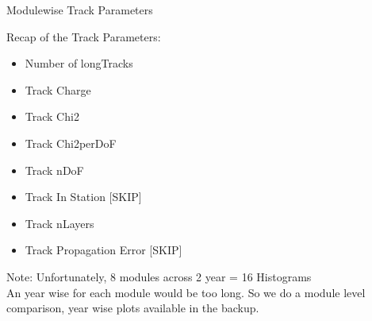 \begin{frame}{Modulewise Track Parameters}
    
    Recap of the Track Parameters:
    \begin{itemize}
        \item Number of longTracks
        \item Track Charge
        \item Track Chi2 
        \item Track Chi2perDoF
        \item Track nDoF
        \item Track In Station [SKIP]
        \item Track nLayers
        \item Track Propagation Error [SKIP]
    \end{itemize}
    \vspace{0.3 cm}
    \small{    
    Note: Unfortunately, 8 modules across 2 year = 16 Histograms \\
    An year wise for each module would be too long.
    So we do a module level comparison, year wise plots available in the backup.
    }
\end{frame}




